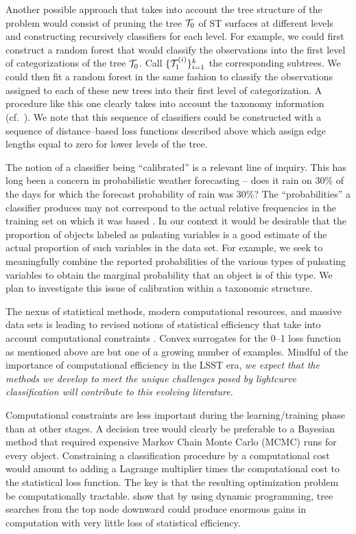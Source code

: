 Another possible approach that takes into account the tree structure of the
problem would consist of pruning the tree ${\cal T}_0$ of ST surfaces at
different levels and constructing recursively classifiers for each level.  For
example, we could first construct a random forest that would classify the
observations into the first level of categorizations of the tree ${\cal T}_0$.
Call $\{{\cal T}_1^{(i)}\}_{i=1}^k$ the corresponding subtrees. We could then
fit a random forest in the same fashion to classify the observations assigned to
each of these new trees into their first level of categorization. A procedure
like this one clearly takes into account the taxonomy information (cf.\
\citealt{CesaBianchi06}).  We note that this sequence of classifiers could be
constructed with a sequence of distance--based loss functions described above
which assign edge lengths equal to zero for lower levels of the tree.

The notion of a classifier being ``calibrated'' is a relevant line of inquiry.
This has long been a concern in probabilistic weather forecasting -- does it
rain on 30\% of the days for which the forecast probability of rain was 30\%?
The ``probabilities'' a classifier produces may not correspond to the actual
relative frequencies in the training set on which it was based
\citep{niculescu05:obtaining}.  In our context it would be desirable that the
proportion of objects labeled as pulsating variables is a good estimate of the
actual proportion of such variables in the data set.  For example, we seek  to
meaningfully combine  the reported probabilities of the various types of
pulsating variables to obtain the marginal probability that an object is of this
type.  We plan to investigate this issue of calibration within a taxonomic
structure.

The nexus of statistical methods, modern computational resources, and massive
data sets is leading to revised notions of statistical efficiency that take into
account computational constraints \citep{MeinBickRice2008}.  Convex surrogates
for the 0--1 loss function as mentioned above are but one of a growing number of
examples. Mindful of the importance of computational efficiency in the LSST era,
{\it we expect that the methods we develop to meet the unique challenges posed
by lightcurve classification will contribute to this evolving literature.}

Computational constraints are less important during the learning/training phase
than at other stages.  A decision tree would clearly be preferable to a Bayesian
method that required expensive Markov Chain Monte Carlo (MCMC) runs for every
object. Constraining a classification procedure by a computational cost would
amount to adding a Lagrange multiplier times the computational cost to the
statistical loss function.  The key is that the resulting optimization problem
be computationally tractable.   \citet{MeinBickRice2008} show that by using
dynamic programming,  tree searches from the top node downward  could produce
enormous gains in computation with very little loss of statistical efficiency.

